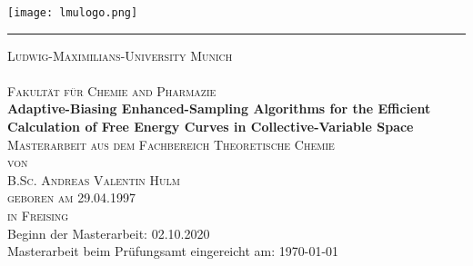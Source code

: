 \begin{titlepage}
\begin{center}
{

\vspace*{-1.5cm}
\hfill \texttt{[image: lmulogo.png]}

\hrule                                 %

\textsc{\LARGE Ludwig-Maximilians-University Munich}\\[2cm]

\textsc{\Large }\\[0.5cm]

\textsc{\Large Fakultät für Chemie and Pharmazie}\\[2.5cm]

\textbf{\LARGE Adaptive-Biasing Enhanced-Sampling Algorithms for the Efficient Calculation of Free Energy Curves in Collective-Variable Space} \\[0.5cm]

\textsc{\Large Masterarbeit aus dem Fachbereich Theoretische Chemie}\\[2.0cm]


\textsc{von}\\
\textsc{B.Sc. Andreas Valentin Hulm} \\[1,5cm]
\textsc{geboren am 29.04.1997} \\
\textsc{in Freising} \\ [2,5cm]


Beginn der Masterarbeit: 02.10.2020 \\
Masterarbeit beim Prüfungsamt eingereicht am: \today
}
\end{center}

\end{titlepage}
